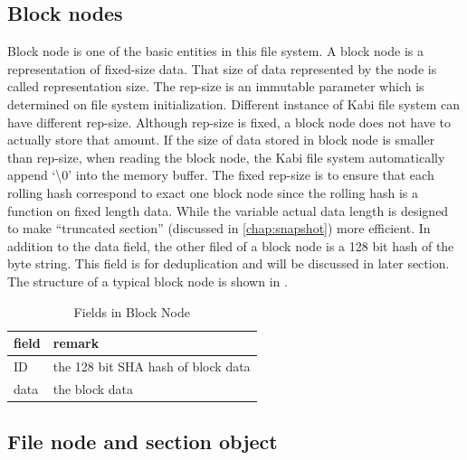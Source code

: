 \subsection{Block nodes}

    Block node is one of the basic entities in this file system. A block node is a representation of fixed-size data. That size of data represented by the node is called representation size. The rep-size is an immutable parameter which is determined on file system initialization. Different instance of Kabi file system can have different rep-size. Although rep-size is fixed, a block node does not have to actually store that amount. If the size of data stored in block node is smaller than rep-size, when reading the block node, the Kabi file system automatically append `\textbackslash0' into the memory buffer. The fixed rep-size is to ensure that each rolling hash correspond to exact one block node since the rolling hash is a function on fixed length data. While the variable actual data length is designed to make ``truncated section'' (discussed in \cref{chap:snapshot}) more efficient. In addition to the data field, the other filed of a block node is a 128 bit hash of the byte string. This field is for deduplication and will be discussed in later section. The structure of a typical block node is shown in .

\begin{table}
\caption{Fields in Block Node}
\label{tab:block_fields}
\begin{center}
\begin{tabular}{ll}
\toprule
field & remark\\
\midrule
ID & the 128 bit SHA hash of block data\\
data & the block data\\
\bottomrule
\end{tabular}
\end{center}
\end{table}

\subsection{File node and section object}

